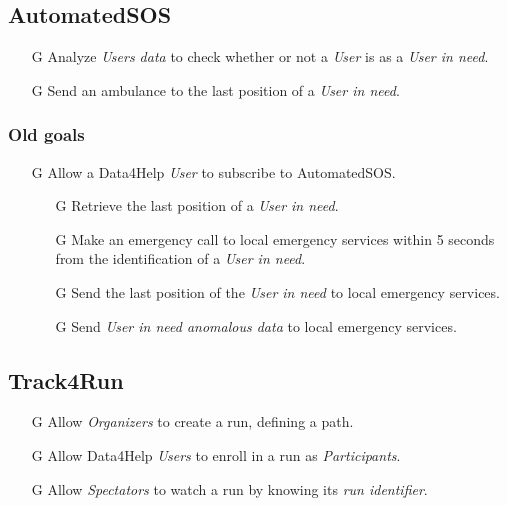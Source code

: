 \documentclass[../../rasd.tex]{subfiles}
\begin{document}
				\subsection{AutomatedSOS}
					\begin{itemize}
						\item[G\subs{7}]Analyze \textit{Users data} to check whether or not a \textit{User} is as a \textit{User in need}.
						\item[G\subs{8}]Send an ambulance to the last position of a \textit{User in need}.
					\end{itemize}

					\subsubsection{Old goals}
					\begin{itemize}
						\item[G\subs{12}]Allow a Data4Help \textit{User} to subscribe to AutomatedSOS.
						\begin{itemize}
								\item[G\subs{14.1}]Retrieve the last position of a \textit{User in need}.
								\item[G\subs{14.2}]Make an emergency call to local emergency services within 5 seconds from the identification of a \textit{User in need}.
								\item[G\subs{14.3}]Send the last position of the \textit{User in need} to local emergency services.
								\item[G\subs{14.4}]Send \textit{User in need anomalous data} to local emergency services.
							\end{itemize}

					\end{itemize}





				\subsection{Track4Run}
					\begin{itemize}
						\item[G\subs{9}]Allow \textit{Organizers} to create a run, defining a path.
						\item[G\subs{10}]Allow Data4Help \textit{Users} to enroll in a run as \textit{Participants}. 
						\item[G\subs{11}]Allow \textit{Spectators} to watch a run by knowing its \textit{run identifier}.
					\end{itemize}
\end{document}
